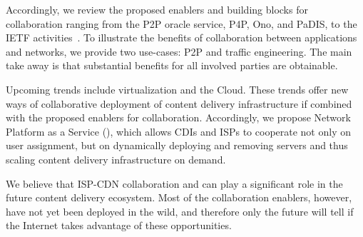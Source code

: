 Accordingly, we review the proposed enablers and building blocks for
collaboration ranging from the P2P oracle service, P4P, Ono, and PaDIS, to the
IETF activities~\cite{afs-cispp2pcip-ccr07,p4p,taming,PADIS2010,ALTO-WG,CDNi}. To
illustrate the benefits of collaboration between applications and networks, we
provide two use-cases: P2P and traffic engineering. The main take away is that
substantial benefits for all involved parties are obtainable.

Upcoming trends include virtualization and the Cloud. These trends offer new
ways of collaborative deployment of content delivery infrastructure if combined
with the proposed enablers for collaboration.  Accordingly, we propose Network
Platform as a Service (\Netpaas), which allows CDIs and ISPs to cooperate not
only on user assignment, but on dynamically deploying and removing servers and
thus scaling content delivery infrastructure on demand.

We believe that ISP-CDN collaboration and \Netpaas can play a significant role
in the future content delivery ecosystem.  Most of the collaboration enablers,
however, have not yet been deployed in the wild, and therefore only the future
will tell if the Internet takes advantage of these opportunities.
